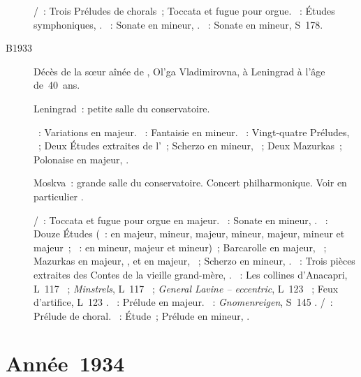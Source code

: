 \begin{description}
 \textsc{\JBach{}/\Busoni{}}~: Trois Préludes de chorals~; Toccata et fugue
 pour orgue.
 \textsc{\Schumann{}}~: Études symphoniques, .
 \textsc{\Beethoven{}}~: Sonate en \kC \Sharp mineur,  .
 \textsc{\Liszt{}}~: Sonate en \kB mineur, S~178.
 \item[B1933]
 Décès de la sœur aînée de \VSofronitsky{}, Ol'ga Vladimirovna, à Leningrad
 à l'âge de~40~ans.
 \item[\DateWithWeekDay{1933-12-23}]
 Leningrad~: petite salle du conservatoire.

 \textsc{\Haendel{}}~: Variations en \kE majeur.
 \textsc{\Mozart{}}~: Fantaisie en \kC mineur.
 \textsc{\Chopin{}}~: Vingt-quatre Préludes, ~; Deux Études
 extraites de l'~; Scherzo en \kC \Sharp mineur, ~; Deux
 Mazurkas~; Polonaise en \kA \Flat majeur, .
 \item[\DateWithWeekDay{1933-12-25}]
 Moskva~: grande salle du conservatoire.
 Concert philharmonique.
 Voir en particulier \citet[p.~427]{Milshteyn82a}.

 \textsc{\JBach{}/\Busoni{}}~: Toccata et fugue pour orgue en \kC majeur.
 \textsc{\Beethoven{}}~: Sonate en \kC \Sharp mineur,  .
 \textsc{\Chopin{}}~: Douze Études (~: en \kC majeur, \kA mineur,
 \kE majeur, \kC \Sharp mineur, \kG \Flat majeur, \kE \Flat mineur et \kF
 majeur~; ~: en \kF mineur, \kF majeur et \kC mineur)~; Barcarolle
 en \kF \Sharp majeur, ~; Mazurkas en \kD majeur, 
 , et en \kB majeur,  ~; Scherzo en \kB \Flat
 mineur, .
 \textsc{\Prokofiev{}}~: Trois pièces extraites des Contes de la vieille
 grand-mère, .
 \textsc{\Debussy{}}~: Les collines d'\hbox{Anacapri}, L~117 ~;
 \emph{Minstrels}, L~117 ~; \emph{General Lavine -- eccentric},
 L~123 ~; Feux d'artifice, L~123 .
 \textsc{\Rachmaninov{}}~: Prélude en \kG majeur.
 \textsc{\Liszt{}}~: \emph{Gnomenreigen}, S~145 .
 \textsc{\JBach{}/\Busoni{}}~: Prélude de choral.
 \textsc{\Chopin{}}~: Étude~; Prélude en \kD mineur,  .
\end{description}

\section{Année~1934}

